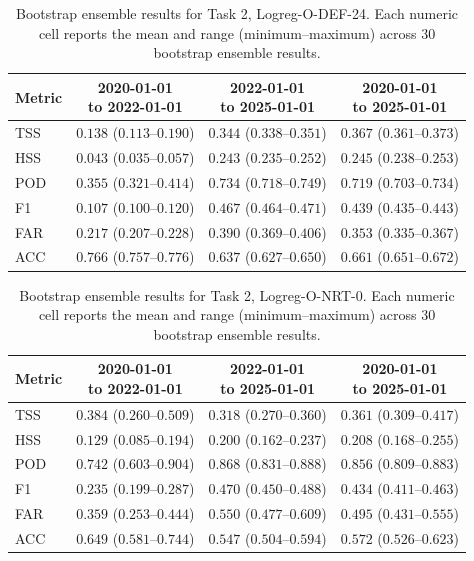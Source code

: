 \begin{table}[htbp]
\centering
\small
\caption{Bootstrap ensemble results for Task 2, Logreg-O-DEF-24. Each numeric cell reports the mean and range (minimum--maximum) across 30 bootstrap ensemble results.}
\label{tab:app-task2-logreg-o-def-24}
\begin{tabular}{lccc}
\toprule
Metric & \shortstack{2020-01-01\\to 2022-01-01} & \shortstack{2022-01-01\\to 2025-01-01} & \shortstack{2020-01-01\\to 2025-01-01} \\
\midrule
TSS & $0.138$ ($0.113$--$0.190$) & $0.344$ ($0.338$--$0.351$) & $0.367$ ($0.361$--$0.373$) \\
HSS & $0.043$ ($0.035$--$0.057$) & $0.243$ ($0.235$--$0.252$) & $0.245$ ($0.238$--$0.253$) \\
POD & $0.355$ ($0.321$--$0.414$) & $0.734$ ($0.718$--$0.749$) & $0.719$ ($0.703$--$0.734$) \\
F1 & $0.107$ ($0.100$--$0.120$) & $0.467$ ($0.464$--$0.471$) & $0.439$ ($0.435$--$0.443$) \\
FAR & $0.217$ ($0.207$--$0.228$) & $0.390$ ($0.369$--$0.406$) & $0.353$ ($0.335$--$0.367$) \\
ACC & $0.766$ ($0.757$--$0.776$) & $0.637$ ($0.627$--$0.650$) & $0.661$ ($0.651$--$0.672$) \\
\bottomrule
\end{tabular}
\end{table}
\clearpage

\begin{table}[htbp]
\centering
\small
\caption{Bootstrap ensemble results for Task 2, Logreg-O-NRT-0. Each numeric cell reports the mean and range (minimum--maximum) across 30 bootstrap ensemble results.}
\label{tab:app-task2-logreg-o-nrt-0}
\begin{tabular}{lccc}
\toprule
Metric & \shortstack{2020-01-01\\to 2022-01-01} & \shortstack{2022-01-01\\to 2025-01-01} & \shortstack{2020-01-01\\to 2025-01-01} \\
\midrule
TSS & $0.384$ ($0.260$--$0.509$) & $0.318$ ($0.270$--$0.360$) & $0.361$ ($0.309$--$0.417$) \\
HSS & $0.129$ ($0.085$--$0.194$) & $0.200$ ($0.162$--$0.237$) & $0.208$ ($0.168$--$0.255$) \\
POD & $0.742$ ($0.603$--$0.904$) & $0.868$ ($0.831$--$0.888$) & $0.856$ ($0.809$--$0.883$) \\
F1 & $0.235$ ($0.199$--$0.287$) & $0.470$ ($0.450$--$0.488$) & $0.434$ ($0.411$--$0.463$) \\
FAR & $0.359$ ($0.253$--$0.444$) & $0.550$ ($0.477$--$0.609$) & $0.495$ ($0.431$--$0.555$) \\
ACC & $0.649$ ($0.581$--$0.744$) & $0.547$ ($0.504$--$0.594$) & $0.572$ ($0.526$--$0.623$) \\
\bottomrule
\end{tabular}
\end{table}
\clearpage

